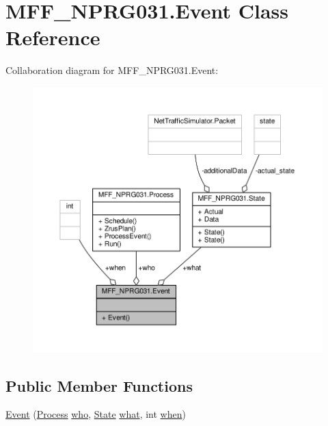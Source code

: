 \hypertarget{classMFF__NPRG031_1_1Event}{\section{M\-F\-F\-\_\-\-N\-P\-R\-G031.\-Event Class Reference}
\label{classMFF__NPRG031_1_1Event}
}


Collaboration diagram for M\-F\-F\-\_\-\-N\-P\-R\-G031.\-Event\-:\nopagebreak
\begin{figure}[H]
\begin{center}
\leavevmode
\includegraphics[width=350pt]{classMFF__NPRG031_1_1Event__coll__graph}
\end{center}
\end{figure}
\subsection*{Public Member Functions}
\begin{DoxyCompactItemize}
\item 
\hyperlink{classMFF__NPRG031_1_1Event_adbd83e9064636ea352f06fb82fc2fb29}{Event} (\hyperlink{classMFF__NPRG031_1_1Process}{Process} \hyperlink{classMFF__NPRG031_1_1Event_a6e7bdfc2ff5a26bd896029b56d8f0756}{who}, \hyperlink{classMFF__NPRG031_1_1State}{State} \hyperlink{classMFF__NPRG031_1_1Event_a67299cb9ed36b10f47f75d41a270b4b7}{what}, int \hyperlink{classMFF__NPRG031_1_1Event_a7a80c569961ddf9f12ef8f7cb5782794}{when})
\end{DoxyCompactItemize}

